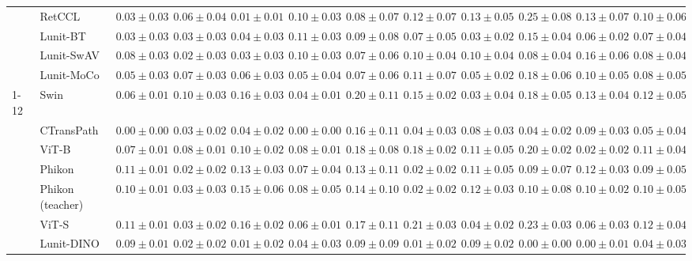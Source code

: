 \begin{tabular}{ll|cccc|c|cccc|c}
 & RetCCL & $0.03 \pm 0.03$ & $0.06 \pm 0.04$ & $\mathbf{0.01 \pm 0.01}$ & $0.10 \pm 0.03$ & $0.08 \pm 0.07$ & $0.12 \pm 0.07$ & $0.13 \pm 0.05$ & $0.25 \pm 0.08$ & $0.13 \pm 0.07$ & $0.10 \pm 0.06$ \\
 & Lunit-BT & $0.03 \pm 0.03$ & $0.03 \pm 0.03$ & $0.04 \pm 0.03$ & $0.11 \pm 0.03$ & $0.09 \pm 0.08$ & $0.07 \pm 0.05$ & $\mathbf{0.03 \pm 0.02}$ & $0.15 \pm 0.04$ & $0.06 \pm 0.02$ & $0.07 \pm 0.04$ \\
 & Lunit-SwAV & $0.08 \pm 0.03$ & $\mathbf{0.02 \pm 0.03}$ & $0.03 \pm 0.03$ & $0.10 \pm 0.03$ & $0.07 \pm 0.06$ & $0.10 \pm 0.04$ & $0.10 \pm 0.04$ & $0.08 \pm 0.04$ & $0.16 \pm 0.06$ & $0.08 \pm 0.04$ \\
 & Lunit-MoCo & $0.05 \pm 0.03$ & $0.07 \pm 0.03$ & $0.06 \pm 0.03$ & $0.05 \pm 0.04$ & $0.07 \pm 0.06$ & $0.11 \pm 0.07$ & $0.05 \pm 0.02$ & $0.18 \pm 0.06$ & $0.10 \pm 0.05$ & $0.08 \pm 0.05$ \\
\cline{1-12}
\multirow[t]{12}{*}{Mean pool} & Swin & $0.06 \pm 0.01$ & $0.10 \pm 0.03$ & $0.16 \pm 0.03$ & $0.04 \pm 0.01$ & $0.20 \pm 0.11$ & $0.15 \pm 0.02$ & $0.03 \pm 0.04$ & $0.18 \pm 0.05$ & $0.13 \pm 0.04$ & $0.12 \pm 0.05$ \\
 & CTransPath & $\mathbf{0.00 \pm 0.00}$ & $0.03 \pm 0.02$ & $0.04 \pm 0.02$ & $\mathbf{0.00 \pm 0.00}$ & $0.16 \pm 0.11$ & $0.04 \pm 0.03$ & $0.08 \pm 0.03$ & $0.04 \pm 0.02$ & $0.09 \pm 0.03$ & $0.05 \pm 0.04$ \\
 & ViT-B & $0.07 \pm 0.01$ & $0.08 \pm 0.01$ & $0.10 \pm 0.02$ & $0.08 \pm 0.01$ & $0.18 \pm 0.08$ & $0.18 \pm 0.02$ & $0.11 \pm 0.05$ & $0.20 \pm 0.02$ & $0.02 \pm 0.02$ & $0.11 \pm 0.04$ \\
 & Phikon & $0.11 \pm 0.01$ & $0.02 \pm 0.02$ & $0.13 \pm 0.03$ & $0.07 \pm 0.04$ & $0.13 \pm 0.11$ & $0.02 \pm 0.02$ & $0.11 \pm 0.05$ & $0.09 \pm 0.07$ & $0.12 \pm 0.03$ & $0.09 \pm 0.05$ \\
 & Phikon (teacher) & $0.10 \pm 0.01$ & $0.03 \pm 0.03$ & $0.15 \pm 0.06$ & $0.08 \pm 0.05$ & $0.14 \pm 0.10$ & $0.02 \pm 0.02$ & $0.12 \pm 0.03$ & $0.10 \pm 0.08$ & $0.10 \pm 0.02$ & $0.10 \pm 0.05$ \\
 & ViT-S & $0.11 \pm 0.01$ & $0.03 \pm 0.02$ & $0.16 \pm 0.02$ & $0.06 \pm 0.01$ & $0.17 \pm 0.11$ & $0.21 \pm 0.03$ & $0.04 \pm 0.02$ & $0.23 \pm 0.03$ & $0.06 \pm 0.03$ & $0.12 \pm 0.04$ \\
 & Lunit-DINO & $0.09 \pm 0.01$ & $0.02 \pm 0.02$ & $\mathbf{0.01 \pm 0.02}$ & $0.04 \pm 0.03$ & $\mathbf{0.09 \pm 0.09}$ & $\mathbf{0.01 \pm 0.02}$ & $0.09 \pm 0.02$ & $\mathbf{0.00 \pm 0.00}$ & $\mathbf{0.00 \pm 0.01}$ & $\mathbf{0.04 \pm 0.03}$ \\

\end{tabular}
